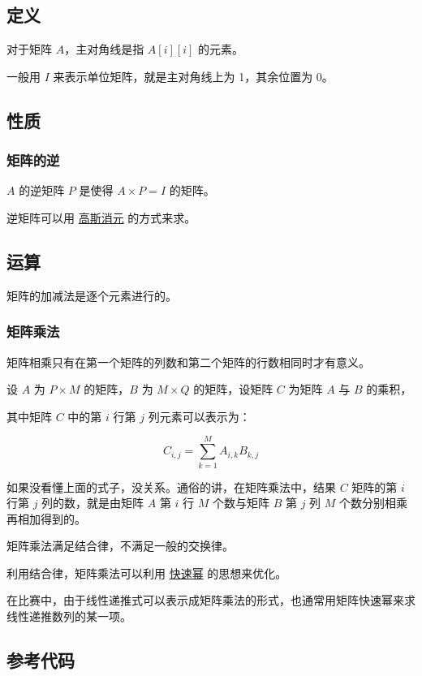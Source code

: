 
\subsection{定义}

对于矩阵 $A$，主对角线是指 $A[i][i]$ 的元素。

一般用 $I$ 来表示单位矩阵，就是主对角线上为 1，其余位置为 0。

\subsection{性质}

\subsubsection{矩阵的逆}

$A$ 的逆矩阵 $P$ 是使得 $A \times P = I$ 的矩阵。

逆矩阵可以用 \href{/math/gauss/}{高斯消元} 的方式来求。

\subsection{运算}

矩阵的加减法是逐个元素进行的。

\subsubsection{矩阵乘法}

矩阵相乘只有在第一个矩阵的列数和第二个矩阵的行数相同时才有意义。

设 $A$ 为 $P \times M$ 的矩阵，$B$ 为 $M \times Q$ 的矩阵，设矩阵 $C$ 为矩阵 $A$ 与 $B$ 的乘积，

其中矩阵 $C$ 中的第 $i$ 行第 $j$ 列元素可以表示为：

$$
C_{i,j} = \sum_{k=1}^MA_{i,k}B_{k,j}
$$

如果没看懂上面的式子，没关系。通俗的讲，在矩阵乘法中，结果 $C$ 矩阵的第 $i$ 行第 $j$ 列的数，就是由矩阵 $A$ 第 $i$ 行 $M$ 个数与矩阵 $B$ 第 $j$ 列 $M$ 个数分别相乘再相加得到的。

矩阵乘法满足结合律，不满足一般的交换律。

利用结合律，矩阵乘法可以利用 \href{/math/quick-pow/}{快速幂} 的思想来优化。

在比赛中，由于线性递推式可以表示成矩阵乘法的形式，也通常用矩阵快速幂来求线性递推数列的某一项。

\subsection{参考代码}

